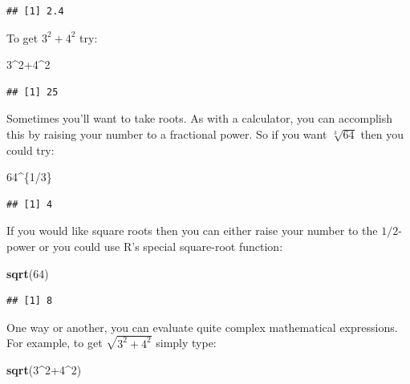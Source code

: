 \documentclass[]{book}
\makeatletter
\newenvironment{Shaded}{\begin{snugshade}}{\end{snugshade}}
\newcommand{\KeywordTok}[1]{\textcolor[rgb]{0.13,0.29,0.53}{\textbf{{#1}}}}
\newcommand{\DecValTok}[1]{\textcolor[rgb]{0.00,0.00,0.81}{{#1}}}
\newcommand{\NormalTok}[1]{{#1}}
\newenvironment{kframe}{%
\medskip{}
\setlength{\fboxsep}{.8em}
 \def\at@end@of@kframe{}%
 \ifinner\ifhmode%
  \def\at@end@of@kframe{\end{minipage}}%
  \begin{minipage}{\columnwidth}%
 \fi\fi%
 \def\FrameCommand##1{\hskip\@totalleftmargin \hskip-\fboxsep
 \colorbox{shadecolor}{##1}\hskip-\fboxsep
     \hskip-\linewidth \hskip-\@totalleftmargin \hskip\columnwidth}%
 \MakeFramed {\advance\hsize-\width
   \@totalleftmargin\z@ \linewidth\hsize
   \@setminipage}}%
 {\par\unskip\endMakeFramed%
 \at@end@of@kframe}
\renewenvironment{Shaded}{\begin{kframe}}{\end{kframe}}
\theoremstyle{definition}
\theoremstyle{definition}
\theoremstyle{remark}
\makeatother
\begin{document}
\begin{verbatim}
## [1] 2.4
\end{verbatim}

To get \(3^2 + 4^2\) try:

\begin{Shaded}
\begin{Highlighting}[]
\DecValTok{3}\NormalTok{^}\DecValTok{2+4}\NormalTok{^}\DecValTok{2}
\end{Highlighting}
\end{Shaded}

\begin{verbatim}
## [1] 25
\end{verbatim}

Sometimes you'll want to take roots. As with a calculator, you can
accomplish this by raising your number to a fractional power. So if you
want \(\sqrt[3]{64}\) then you could try:

\begin{Shaded}
\begin{Highlighting}[]
\DecValTok{64}\NormalTok{^\{}\DecValTok{1}\NormalTok{/}\DecValTok{3}\NormalTok{\}}
\end{Highlighting}
\end{Shaded}

\begin{verbatim}
## [1] 4
\end{verbatim}

If you would like square roots then you can either raise your number to
the \(1/2\)-power or you could use R's special square-root function:

\begin{Shaded}
\begin{Highlighting}[]
\KeywordTok{sqrt}\NormalTok{(}\DecValTok{64}\NormalTok{)}
\end{Highlighting}
\end{Shaded}

\begin{verbatim}
## [1] 8
\end{verbatim}

One way or another, you can evaluate quite complex mathematical
expressions. For example, to get \(\sqrt{3^2 + 4^2}\) simply type:

\begin{Shaded}
\begin{Highlighting}[]
\KeywordTok{sqrt}\NormalTok{(}\DecValTok{3}\NormalTok{^}\DecValTok{2+4}\NormalTok{^}\DecValTok{2}\NormalTok{)}
\end{Highlighting}
\end{Shaded}
\end{document}
